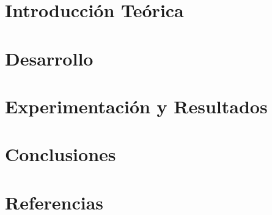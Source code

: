 \documentclass[a4paper]{article}
\begin{document}



\titulotp


\section{Introducci\'on Te\'orica}



\section{Desarrollo}



\section{Experimentaci\'on y Resultados}




%

\section{Conclusiones}




%

\section{Referencias}


\end{document}

